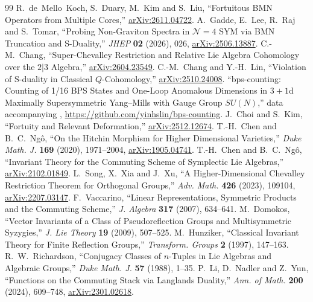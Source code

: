 \documentclass[11pt]{article}
\numberwithin{equation}{section}
\numberwithin{figure}{section}
\numberwithin{table}{section}
\begin{document}
\begin{thebibliography}{99}
R.~de~Mello~Koch, S.~Duary, M.~Kim and S.~Liu, ``Fortuitous BMN Operators from Multiple Cores,'' \href{https://arxiv.org/abs/2611.04722}{arXiv:2611.04722}.
A.~Gadde, E.~Lee, R.~Raj and S.~Tomar, ``Probing Non-Graviton Spectra in $\mathcal N=4$ SYM via BMN Truncation and S-Duality,'' \emph{JHEP} \textbf{02} (2026), 026, \href{https://arxiv.org/abs/2506.13887}{arXiv:2506.13887}.
C.-M.~Chang, ``Super-Chevalley Restriction and Relative Lie Algebra Cohomology over the $2|3$ Algebra,'' \href{https://arxiv.org/abs/2604.23549}{arXiv:2604.23549}.
C.-M.~Chang and Y.-H.~Lin, ``Violation of S-duality in Classical $Q$-Cohomology,'' \href{https://arxiv.org/abs/2510.24008}{arXiv:2510.24008}.
``bps-counting: Counting of 1/16 BPS States and One-Loop Anomalous Dimensions in $3+1$d Maximally Supersymmetric Yang--Mills with Gauge Group $SU(N)$,'' data accompanying \cite{ChangLinWords}, \url{https://github.com/yinhslin/bps-counting}.
J.~Choi and S.~Kim, ``Fortuity and Relevant Deformation,'' \href{https://arxiv.org/abs/2512.12674}{arXiv:2512.12674}.
T.-H.~Chen and B.~C.~Ng\^o, ``On the Hitchin Morphism for Higher Dimensional Varieties,'' \emph{Duke Math. J.} \textbf{169} (2020), 1971--2004, \href{https://arxiv.org/abs/1905.04741}{arXiv:1905.04741}.
T.-H.~Chen and B.~C.~Ng\^o, ``Invariant Theory for the Commuting Scheme of Symplectic Lie Algebras,'' \href{https://arxiv.org/abs/2102.01849}{arXiv:2102.01849}.
L.~Song, X.~Xia and J.~Xu, ``A Higher-Dimensional Chevalley Restriction Theorem for Orthogonal Groups,'' \emph{Adv. Math.} \textbf{426} (2023), 109104, \href{https://arxiv.org/abs/2207.03147}{arXiv:2207.03147}.
F.~Vaccarino, ``Linear Representations, Symmetric Products and the Commuting Scheme,'' \emph{J. Algebra} \textbf{317} (2007), 634--641.
M.~Domokos, ``Vector Invariants of a Class of Pseudoreflection Groups and Multisymmetric Syzygies,'' \emph{J. Lie Theory} \textbf{19} (2009), 507--525.
M.~Hunziker, ``Classical Invariant Theory for Finite Reflection Groups,'' \emph{Transform. Groups} \textbf{2} (1997), 147--163.
R.~W.~Richardson, ``Conjugacy Classes of $n$-Tuples in Lie Algebras and Algebraic Groups,'' \emph{Duke Math. J.} \textbf{57} (1988), 1--35.
P.~Li, D.~Nadler and Z.~Yun, ``Functions on the Commuting Stack via Langlands Duality,'' \emph{Ann. of Math.} \textbf{200} (2024), 609--748, \href{https://arxiv.org/abs/2301.02618}{arXiv:2301.02618}.

\end{thebibliography}
\end{document}

